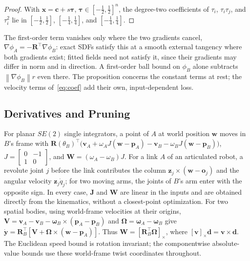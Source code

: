 \documentclass[journal]{IEEEtran}
\theoremstyle{definition}
\newcommand{\norm}[1]{\left\lVert #1\right\rVert}
\newcommand{\Rot}{\mathbf{R}}
\begin{document}
\begin{proof}
With $\mathbf x=\mathbf c+s\boldsymbol\tau$, $\boldsymbol\tau\in[-\frac12,\frac12]^n$, the degree-two
coefficients of $\tau_i$, $\tau_i\tau_j$, and $\tau_i^2$ lie in $[-\frac12,\frac12]$,
$[-\frac14,\frac14]$, and $[-\frac14,\frac14]$.
\end{proof}
The first-order term vanishes only where the two gradients cancel, $\nabla\phi_A=-\Rot^\top\nabla\phi_B$:
exact SDFs satisfy this at a smooth external tangency where both gradients exist; fitted fields
need not satisfy it, since
their gradients may differ in norm and in direction. A first-order ball bound on $\phi_B$ alone
subtracts $\norm{\nabla\phi_B}r$ even there. The proposition concerns the constant terms at rest; the velocity
terms of~\eqref{eq:coef} add their own, input-dependent loss.

\subsection{Derivatives and Pruning}\label{sec:cover-der}
For planar $SE(2)$ single integrators, a point of $A$ at world position $\mathbf w$ moves in $B$'s frame
with $\Rot(\theta_B)^{\!\top}\big(\mathbf v_A+\omega_AJ(\mathbf w-\mathbf p_A)-\mathbf v_B-\omega_BJ(\mathbf w-\mathbf p_B)\big)$,
$J=\left[\begin{smallmatrix}0&-1\\1&0\end{smallmatrix}\right]$, and
$\mathbf W=(\omega_A-\omega_B)J$. For a link $A$ of an articulated robot, a revolute joint $j$ before
the link contributes the column $\mathbf z_j\times(\mathbf w-\mathbf o_j)$ and the angular velocity
$\mathbf z_j\dot q_j$; for two moving arms, the joints of $B$'s arm enter with the opposite sign. In
every case, $\mathbf J$ and $\mathbf W$ are linear in the inputs and are obtained directly from
the kinematics, without a closest-point optimization.
For two spatial bodies, using world-frame velocities at their origins,
$\mathbf V=\mathbf v_A-\mathbf v_B-\boldsymbol\omega_B\times(\mathbf p_A-\mathbf p_B)$ and
$\boldsymbol\Omega=\boldsymbol\omega_A-\boldsymbol\omega_B$ give
$\dot{\mathbf y}=\Rot_B^\top[\mathbf V+\boldsymbol\Omega\times(\mathbf w-\mathbf p_A)]$.
Thus $\mathbf W=[\Rot_B^\top\boldsymbol\Omega]_\times$, where $[\mathbf v]_\times\mathbf d=\mathbf v\times\mathbf d$.
The Euclidean speed bound is rotation invariant; the componentwise absolute-value bounds
use these world-frame twist coordinates throughout.
\end{document}

